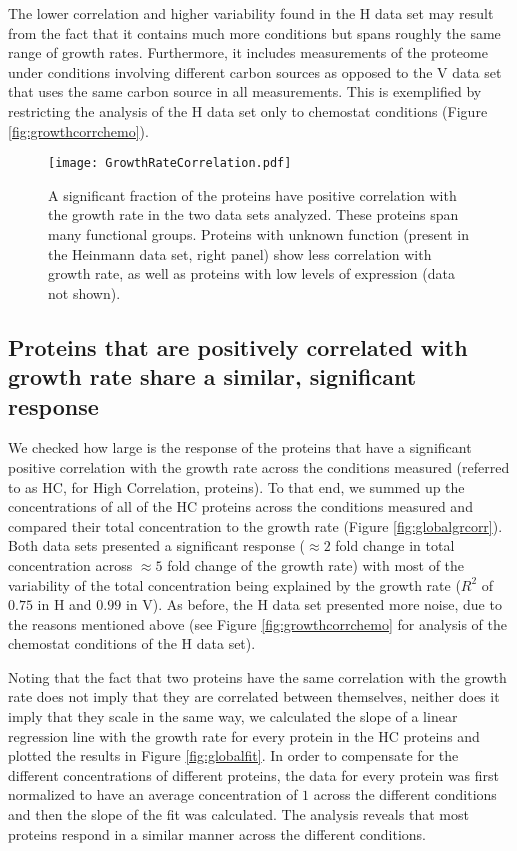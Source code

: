 \documentclass[a4paper,landscape,titlepage,17pt]{extarticle}
\begin{document}
The lower correlation and higher variability found in the H data set may result from the fact that it contains much more conditions but spans roughly the same range of growth rates.
Furthermore, it includes measurements of the proteome under conditions involving different carbon sources as opposed to the V data set that uses the same carbon source in all measurements.
This is exemplified by restricting the analysis of the H data set only to chemostat conditions (Figure \ref{fig:growthcorrchemo}).

\begin{figure}[h]
\centering
\texttt{[image: GrowthRateCorrelation.pdf]}
\caption{\linespread{0.5}\selectfont{}
A significant fraction of the proteins have positive correlation with the growth rate in the two data sets analyzed.
These proteins span many functional groups.
Proteins with unknown function (present in the Heinmann data set, right panel) show less correlation with growth rate, as well as proteins with low levels of expression (data not shown).
}
\label{fig:growthcorr}
\end{figure}

\clearpage        
\subsection*{Proteins that are positively correlated with growth rate share a similar, significant response}
We checked how large is the response of the proteins that have a significant positive correlation with the growth rate across the conditions measured (referred to as HC, for High Correlation, proteins).
To that end, we summed up the concentrations of all of the HC proteins across the conditions measured and compared their total concentration to the growth rate (Figure \ref{fig:globalgrcorr}).
Both data sets presented a significant response ($\approx 2$ fold change in total concentration across $\approx 5$ fold change of the growth rate) with most of the variability of the total concentration being explained by the growth rate ($R^2$ of $0.75$ in H and $0.99$ in V). 
As before, the H data set presented more noise, due to the reasons mentioned above (see Figure \ref{fig:growthcorrchemo} for analysis of the chemostat conditions of the H data set).

Noting that the fact that two proteins have the same correlation with the growth rate does not imply that they are correlated between themselves, neither does it imply that they scale in the same way, we calculated the slope of a linear regression line with the growth rate for every protein in the HC proteins and plotted the results in Figure \ref{fig:globalfit}.
In order to compensate for the different concentrations of different proteins, the data for every protein was first normalized to have an average concentration of $1$ across the different conditions and then the slope of the fit was calculated.
The analysis reveals that most proteins respond in a similar manner across the different conditions.
\end{document}
